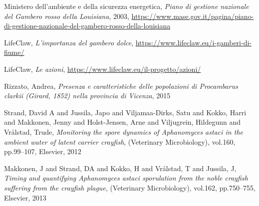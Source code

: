 \documentclass[12pt,a4paper]{article}
\numberwithin{theorem}{section}
\numberwithin{definition}{section}
\numberwithin{example}{section}
\newcommand{\palla}{
	\begin{tikzpicture}
		\node[circle,fill=red!60!RawSienna,inner sep=2pt, scale=2] { };
	\end{tikzpicture}
}
\begin{document}









\newpage

\begin{thebibliography}{10}

  {Ministero dell'ambiente e della sicurezza energetica},
  \textit{Piano di gestione nazionale del Gambero rosso della Louisiana},
  {2003},
  \url{https://www.mase.gov.it/pagina/piano-di-gestione-nazionale-del-gambero-rosso-della-louisiana}

  {LifeClaw},
  \textit{L'importanza del gambero dolce},
  \url{https://www.lifeclaw.eu/i-gamberi-di-fiume/}

  {LifeClaw},
  \textit{Le azioni},
  \url{https://www.lifeclaw.eu/il-progetto/azioni/}

  {Rizzato, Andrea},
  \textit{Presenza e caratteristiche delle popolazioni di Procambarus clarkii (Girard, 1852) nella provincia di Vicenza},
  {2015}







  {Strand, David A and Jussila, Japo and Viljamaa-Dirks, Satu and Kokko, Harri and Makkonen, Jenny and Holst-Jensen, Arne and Viljugrein, Hildegunn and Vr{\aa}lstad, Trude},
  \textit{Monitoring the spore dynamics of Aphanomyces astaci in the ambient water of latent carrier crayfish},
  {(Veterinary Microbiology)},
  {vol.160},
  {pp.99--107},
  {Elsevier},
  {2012}

  {Makkonen, J and Strand, DA and Kokko, H and Vr{\aa}lstad, T and Jussila, J},
  \textit{Timing and quantifying Aphanomyces astaci sporulation from the noble crayfish suffering from the crayfish plague},
  {(Veterinary Microbiology)},
  {vol.162},
  {pp.750--755},
  {Elsevier},
  {2013}

\end{thebibliography}
\end{document}
